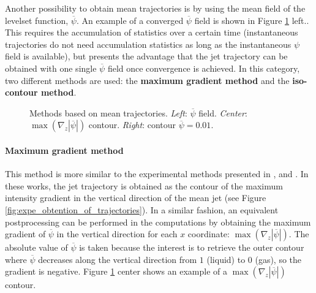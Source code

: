 Another possibility to obtain mean trajectories is by using the mean field of the levelset function, $\overline{\psi}$. An example of a converged $\overline{\psi}$ field is shown in Figure \ref{fig:trajectory_obtention_mean_methods_c_d} left.. This requires the accumulation of statistics over a certain time (instantaneous trajectories do not need accumulation statistics as long as the instantaneous $\psi$ field is available), but presents the advantage that the jet trajectory can be obtained with one single $\overline{\psi}$ field once convergence is achieved. In this category, two different methods are used: the \textbf{maximum gradient method} and the \textbf{iso-contour method}.

\clearpage

\begin{figure}[ht]
     \centering
     \caption[Methods based on mean trajectories]{Methods based on mean trajectories. \textsl{Left}: $\overline{\psi}$ field. \textsl{Center}: $\max \left( \nabla_z | \overline{\psi} | \right)$ contour. \textsl{Right}: contour $\overline{\psi} = 0.01$.}
      \label{fig:trajectory_obtention_mean_methods_c_d}
\end{figure}



\paragraph{Maximum gradient method}

This method is more similar to the experimental methods presented in ,  and . In these works, the jet trajectory is obtained as the contour of the maximum intensity gradient in the vertical direction of the mean jet (see Figure \ref{fig:expe_obtention_of_trajectories}). In a similar fashion, an equivalent postprocessing can be performed in the computations by obtaining the maximum gradient of $\overline{\psi}$ in the vertical direction for each $x$ coordinate: $\max \left( \nabla_z | \overline{\psi} | \right)$. The absolute value of $\overline{\psi}$ is taken because the interest is to retrieve the outer contour where $\overline{\psi}$ decreases along the vertical direction from $1$ (liquid) to 0 (gas), so the gradient is negative. Figure \ref{fig:trajectory_obtention_mean_methods_c_d} center shows an example of a $\max \left( \nabla_z | \overline{\psi} | \right)$ contour. \\


